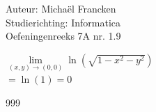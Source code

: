 \documentclass[a4paper]{article}
\begin{document}
\noindent \large Auteur: Michaël Francken \\
\noindent \large Studierichting: Informatica\\
\noindent \large Oefeningenreeks 7A nr. 1.9\\

\medskip

\normalsize

$\lim\limits_{\left(x,y\right)\rightarrow\left(0,0\right)} \ln\left(\sqrt{1-x^2-y^2}\right)$\\

$=\ln(1) = 0$\\

\begin{thebibliography}{999}
\end{thebibliography}
\end{document}
